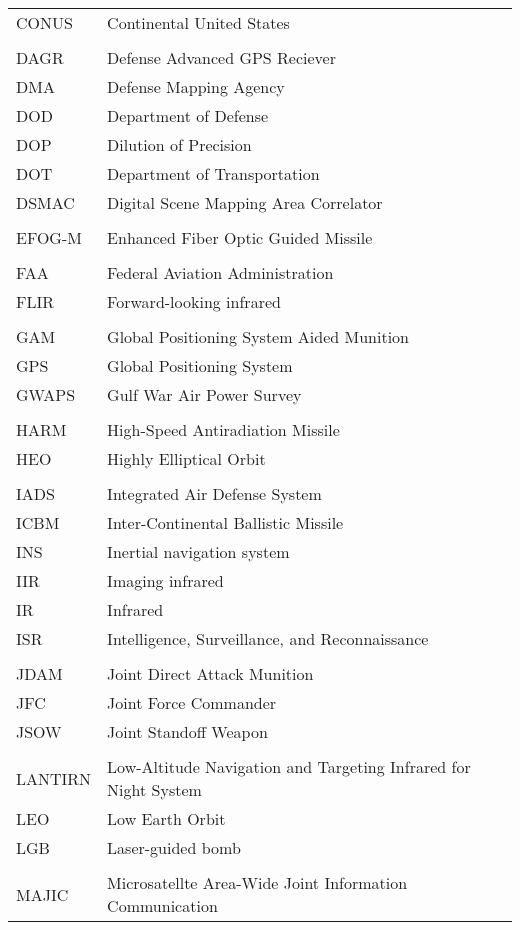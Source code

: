 \begin{supertabular}{ll}
CONUS & Continental United States \\
\\
DAGR & Defense Advanced GPS Reciever \\
DMA & Defense Mapping Agency \\
DOD & Department of Defense \\
DOP & Dilution of Precision \\
DOT & Department of Transportation \\
DSMAC & Digital Scene Mapping Area Correlator \\
\\
EFOG-M & Enhanced Fiber Optic Guided Missile \\
\\
FAA & Federal Aviation Administration \\
FLIR & Forward-looking infrared \\
\\
GAM & Global Positioning System Aided Munition \\
GPS & Global Positioning System \\
GWAPS & Gulf War Air Power Survey \\
\\
HARM & High-Speed Antiradiation Missile \\
HEO & Highly Elliptical Orbit \\
\\
IADS & Integrated Air Defense System \\
ICBM & Inter-Continental Ballistic Missile \\
INS & Inertial navigation system \\
IIR & Imaging infrared \\
IR & Infrared \\
ISR & Intelligence, Surveillance, and Reconnaissance \\
\\
JDAM & Joint Direct Attack Munition \\
JFC & Joint Force Commander \\
JSOW & Joint Standoff Weapon \\
\\
LANTIRN & Low-Altitude Navigation and Targeting Infrared for Night System \\
LEO & Low Earth Orbit \\
LGB & Laser-guided bomb \\
\\
MAJIC & Microsatellte Area-Wide Joint Information Communication \\

\end{supertabular}
